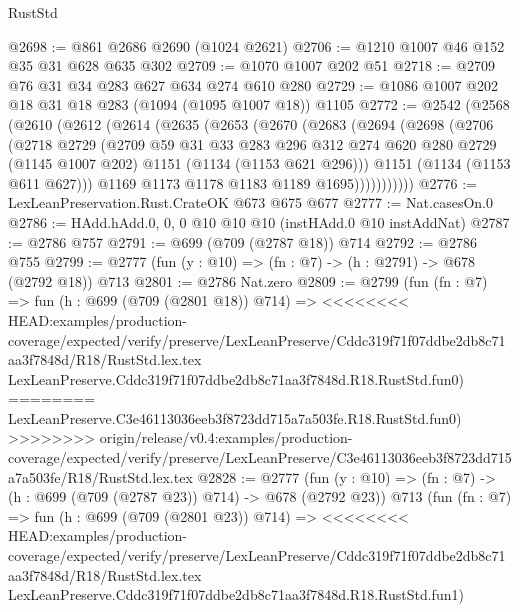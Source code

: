 \begin{lexlean}{RustStd}
\begin{coremodule}
{\begin{coremodule}
{{{{{{{{{@2698 := @861 @2686 @2690 (@1024 @2621)
@2706 := @1210 @1007 @46 @152 @35 @31 @628 @635 @302
@2709 := @1070 @1007 @202 @51
@2718 := @2709 @76 @31 @34 @283 @627 @634 @274 @610 @280
@2729 := @1086 @1007 @202 @18 @31 @18 @283 (@1094 (@1095 @1007 @18)) @1105
@2772 := @2542
    (@2568
      (@2610
        (@2612
          (@2614
            (@2635
              (@2653
                (@2670
                  (@2683
                    (@2694
                      (@2698
                        (@2706
                          (@2718
                            @2729
                            (@2709
                              @59
                              @31
                              @33
                              @283
                              @296
                              @312
                              @274
                              @620
                              @280
                              @2729
                              (@1145 @1007 @202)
                              @1151
                              (@1134 (@1153 @621 @296)))
                            @1151
                            (@1134 (@1153 @611 @627)))
                          @1169
                          @1173
                          @1178
                          @1183
                          @1189
                          @1695)))))))))))
@2776 := LexLeanPreservation.Rust.CrateOK @673 @675 @677
@2777 := Nat.casesOn.{0}
@2786 := HAdd.hAdd.{0, 0, 0} @10 @10 @10 (instHAdd.{0} @10 instAddNat)
@2787 := @2786 @757
@2791 := @699 (@709 (@2787 @18)) @714
@2792 := @2786 @755
@2799 := @2777 (fun (y : @10) => (fn : @7) -> (h : @2791) -> @678 (@2792 @18)) @713
@2801 := @2786 Nat.zero
@2809 := @2799
    (fun (fn : @7) =>
    fun (h : @699 (@709 (@2801 @18)) @714) =>
<<<<<<<< HEAD:examples/production-coverage/expected/verify/preserve/LexLeanPreserve/Cddc319f71f07ddbe2db8c71aa3f7848d/R18/RustStd.lex.tex
    LexLeanPreserve.Cddc319f71f07ddbe2db8c71aa3f7848d.R18.RustStd.fun0)
========
    LexLeanPreserve.C3e46113036eeb3f8723dd715a7a503fe.R18.RustStd.fun0)
>>>>>>>> origin/release/v0.4:examples/production-coverage/expected/verify/preserve/LexLeanPreserve/C3e46113036eeb3f8723dd715a7a503fe/R18/RustStd.lex.tex
@2828 := @2777
    (fun (y : @10) => (fn : @7) -> (h : @699 (@709 (@2787 @23)) @714) -> @678 (@2792 @23))
    @713
    (fun (fn : @7) =>
    fun (h : @699 (@709 (@2801 @23)) @714) =>
<<<<<<<< HEAD:examples/production-coverage/expected/verify/preserve/LexLeanPreserve/Cddc319f71f07ddbe2db8c71aa3f7848d/R18/RustStd.lex.tex
    LexLeanPreserve.Cddc319f71f07ddbe2db8c71aa3f7848d.R18.RustStd.fun1)
}}}}}}}}}
\end{coremodule}}
\end{coremodule}
\end{lexlean}
